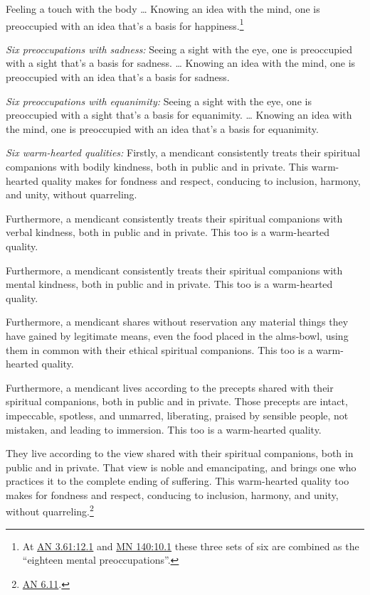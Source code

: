 \documentclass[12pt,openany]{book}%
\begin{document}
Feeling a touch with the body … Knowing an idea with the mind, one is preoccupied with an idea that’s a basis for happiness.\footnote{At \href{https://suttacentral.net/an3.61/en/sujato\#12.1}{AN 3.61:12.1} and \href{https://suttacentral.net/mn140/en/sujato\#10.1}{MN 140:10.1} these three sets of six are combined as the “eighteen mental preoccupations”. } 

\emph{Six preoccupations with sadness:} Seeing a sight with the eye, one is preoccupied with a sight that’s a basis for sadness. … Knowing an idea with the mind, one is preoccupied with an idea that’s a basis for sadness. 

\emph{Six preoccupations with equanimity:} Seeing a sight with the eye, one is preoccupied with a sight that’s a basis for equanimity. … Knowing an idea with the mind, one is preoccupied with an idea that’s a basis for equanimity. 

\emph{Six warm-hearted qualities:} Firstly, a mendicant consistently treats their spiritual companions with bodily kindness, both in public and in private. This warm-hearted quality makes for fondness and respect, conducing to inclusion, harmony, and unity, without quarreling. 

Furthermore, a mendicant consistently treats their spiritual companions with verbal kindness, both in public and in private. This too is a warm-hearted quality. 

Furthermore, a mendicant consistently treats their spiritual companions with mental kindness, both in public and in private. This too is a warm-hearted quality. 

Furthermore, a mendicant shares without reservation any material things they have gained by legitimate means, even the food placed in the alms-bowl, using them in common with their ethical spiritual companions. This too is a warm-hearted quality. 

Furthermore, a mendicant lives according to the precepts shared with their spiritual companions, both in public and in private. Those precepts are intact, impeccable, spotless, and unmarred, liberating, praised by sensible people, not mistaken, and leading to immersion. This too is a warm-hearted quality. 

They live according to the view shared with their spiritual companions, both in public and in private. That view is noble and emancipating, and brings one who practices it to the complete ending of suffering. This warm-hearted quality too makes for fondness and respect, conducing to inclusion, harmony, and unity, without quarreling.\footnote{\href{https://suttacentral.net/an6.11/en/sujato}{AN 6.11}. } 
\end{document}
